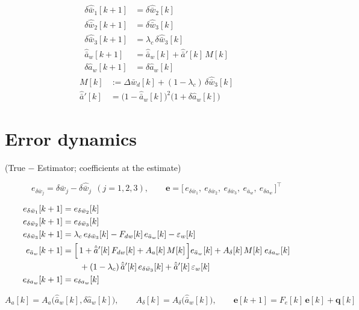 \documentclass[11pt,a4paper,fontset=none]{ctexart}
\begin{document}
\begin{align*}
\delta\hat{\bar{w}}_1[k+1] &= \delta\hat{\bar{w}}_2[k] \\
\delta\hat{\bar{w}}_2[k+1] &= \delta\hat{\bar{w}}_3[k] \\
\delta\hat{\bar{w}}_3[k+1] &= \lambda_c\,\delta\hat{\bar{w}}_3[k] \\
\hat{\bar{a}}_w[k+1] &= \hat{\bar{a}}_w[k] + \hat{\bar{a}}'[k]\,M[k] \\
\delta\hat{a}_w[k+1] &= \delta\hat{a}_w[k]
\end{align*}
\begin{align*}
M[k] &:= \Delta\bar{w}_d[k] + (1-\lambda_c)\,\delta\hat{\bar{w}}_3[k] \\
\hat{\bar{a}}'[k] &= \bigl(1-\hat{\bar{a}}_w[k]\bigr)^{2}
  \bigl(1+\delta\hat{a}_w[k]\bigr)
\end{align*}

\section{Error dynamics}

(True $-$ Estimator; coefficients at the estimate)

\begin{equation*}
e_{\delta\bar{w}_j} = \delta\bar{w}_j - \delta\hat{\bar{w}}_j \ \ (j = 1,2,3),
\qquad
\mathbf{e} = \bigl[\,e_{\delta\bar{w}_1},\ e_{\delta\bar{w}_2},\
e_{\delta\bar{w}_3},\ e_{\bar{a}_w},\ e_{\delta a_w}\,\bigr]^{\top}
\end{equation*}

\begin{align*}
e_{\delta\bar{w}_1}[k+1] &= e_{\delta\bar{w}_2}[k] \\
e_{\delta\bar{w}_2}[k+1] &= e_{\delta\bar{w}_3}[k] \\
e_{\delta\bar{w}_3}[k+1] &= \lambda_c\,e_{\delta\bar{w}_3}[k]
  - F_{dw}[k]\,e_{\bar{a}_w}[k] - \varepsilon_w[k] \\
e_{\bar{a}_w}[k+1] &= \Bigl[\,1 + \hat{\bar{a}}'[k]\,F_{dw}[k]
  + A_a[k]\,M[k]\,\Bigr] e_{\bar{a}_w}[k]
  + A_{\delta}[k]\,M[k]\; e_{\delta a_w}[k] \\
  &\qquad + (1-\lambda_c)\,\hat{\bar{a}}'[k]\,e_{\delta\bar{w}_3}[k]
  + \hat{\bar{a}}'[k]\,\varepsilon_w[k] \\
e_{\delta a_w}[k+1] &= e_{\delta a_w}[k]
\end{align*}

\begin{equation*}
A_a[k] = A_a\bigl(\hat{\bar{a}}_w[k],\delta\hat{a}_w[k]\bigr),
\qquad
A_{\delta}[k] = A_{\delta}\bigl(\hat{\bar{a}}_w[k]\bigr),
\qquad
\mathbf{e}[k+1] = F_e[k]\,\mathbf{e}[k] + \mathbf{q}[k]
\end{equation*}
\end{document}
